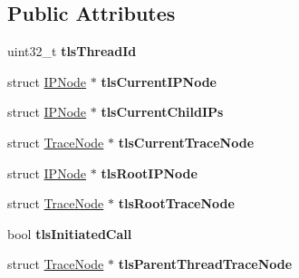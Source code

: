 \subsection*{Public Attributes}
\begin{DoxyCompactItemize}
\item 
\hypertarget{structPinCCTLib_1_1ThreadData_a14ba6d9be9e07cb7ec89b52afa999be0}{uint32\-\_\-t {\bfseries tls\-Thread\-Id}}\label{structPinCCTLib_1_1ThreadData_a14ba6d9be9e07cb7ec89b52afa999be0}

\item 
\hypertarget{structPinCCTLib_1_1ThreadData_a21b73a97dc6335c5e1df5f9c7ff40576}{struct \hyperlink{structPinCCTLib_1_1IPNode}{I\-P\-Node} $\ast$ {\bfseries tls\-Current\-I\-P\-Node}}\label{structPinCCTLib_1_1ThreadData_a21b73a97dc6335c5e1df5f9c7ff40576}

\item 
\hypertarget{structPinCCTLib_1_1ThreadData_a053656beaac18914eef93f3feffc6d50}{struct \hyperlink{structPinCCTLib_1_1IPNode}{I\-P\-Node} $\ast$ {\bfseries tls\-Current\-Child\-I\-Ps}}\label{structPinCCTLib_1_1ThreadData_a053656beaac18914eef93f3feffc6d50}

\item 
\hypertarget{structPinCCTLib_1_1ThreadData_a23cc70adb1a80d163ad9af244bdd09c1}{struct \hyperlink{structPinCCTLib_1_1TraceNode}{Trace\-Node} $\ast$ {\bfseries tls\-Current\-Trace\-Node}}\label{structPinCCTLib_1_1ThreadData_a23cc70adb1a80d163ad9af244bdd09c1}

\item 
\hypertarget{structPinCCTLib_1_1ThreadData_a1db0ca44fbc1ba33d25850e4f71b1807}{struct \hyperlink{structPinCCTLib_1_1IPNode}{I\-P\-Node} $\ast$ {\bfseries tls\-Root\-I\-P\-Node}}\label{structPinCCTLib_1_1ThreadData_a1db0ca44fbc1ba33d25850e4f71b1807}

\item 
\hypertarget{structPinCCTLib_1_1ThreadData_adeb4b6413a57ce5b3d298dd188889f8b}{struct \hyperlink{structPinCCTLib_1_1TraceNode}{Trace\-Node} $\ast$ {\bfseries tls\-Root\-Trace\-Node}}\label{structPinCCTLib_1_1ThreadData_adeb4b6413a57ce5b3d298dd188889f8b}

\item 
\hypertarget{structPinCCTLib_1_1ThreadData_a08460ee6b5cf0def804044d6d8d1cdd2}{bool {\bfseries tls\-Initiated\-Call}}\label{structPinCCTLib_1_1ThreadData_a08460ee6b5cf0def804044d6d8d1cdd2}

\item 
\hypertarget{structPinCCTLib_1_1ThreadData_a9bf0482590129524f99b0a56fe3527a3}{struct \hyperlink{structPinCCTLib_1_1TraceNode}{Trace\-Node} $\ast$ {\bfseries tls\-Parent\-Thread\-Trace\-Node}}\label{structPinCCTLib_1_1ThreadData_a9bf0482590129524f99b0a56fe3527a3}


\end{DoxyCompactItemize}
